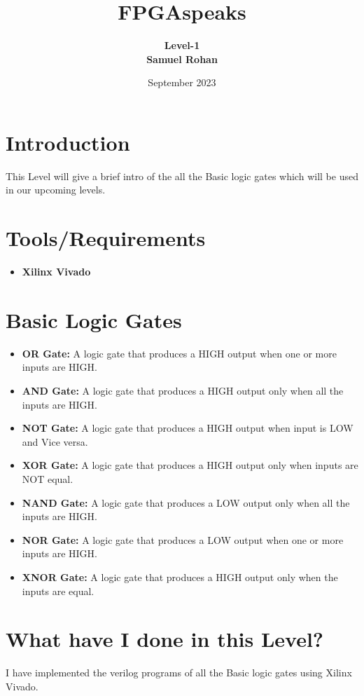 \documentclass{article}
\title{\huge{\textbf{FPGAspeaks}}}
\author{\textbf{Level-1}\\  \textbf{Samuel Rohan}}
\date{September 2023}
\begin{document}
\maketitle
\tableofcontents
\section{Introduction}
This Level will give a brief intro of the all the Basic logic gates which will be used in our upcoming levels.
\section{Tools/Requirements}
\begin{itemize}
    \item \textbf{Xilinx Vivado}
\end{itemize}
\section{Basic Logic Gates}
\begin{itemize}
    \item \textbf{OR Gate:}
    A logic gate that produces a HIGH output when one or more inputs are HIGH.
    \item \textbf{AND Gate:}
    A logic gate that produces a HIGH output only when all the inputs are HIGH.
    \item \textbf{NOT Gate:}
    A logic gate that produces a HIGH output when input is LOW and Vice versa.
    \item \textbf{XOR Gate:}
    A logic gate that produces a HIGH output only when inputs are NOT equal.
    \item \textbf{NAND Gate:}
    A logic gate that produces a LOW output only when all the inputs are HIGH.
    \item \textbf{NOR Gate:}
    A logic gate that produces a LOW output when one or more inputs are HIGH.
    \item \textbf{XNOR Gate:}
    A logic gate that produces a HIGH output only when the inputs are equal.
\end{itemize}
\section{What have I done in this Level?}
I have implemented the verilog programs of all the Basic logic gates using Xilinx Vivado.
\end{document}
